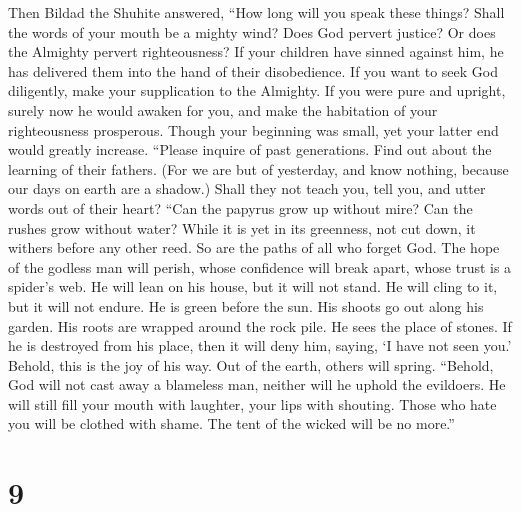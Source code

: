  Then Bildad the Shuhite answered,  ``How long
will you speak these things? Shall the words of your mouth be a mighty
wind?  Does God pervert justice? Or does the Almighty
pervert righteousness?  If your children have sinned against
him, he has delivered them into the hand of their disobedience.
 If you want to seek God diligently, make your supplication
to the Almighty.  If you were pure and upright, surely now
he would awaken for you, and make the habitation of your righteousness
prosperous.  Though your beginning was small, yet your
latter end would greatly increase.  ``Please inquire of past
generations. Find out about the learning of their fathers. 
(For we are but of yesterday, and know nothing, because our days on
earth are a shadow.)  Shall they not teach you, tell you,
and utter words out of their heart?  ``Can the papyrus grow
up without mire? Can the rushes grow without water?  While
it is yet in its greenness, not cut down, it withers before any other
reed.  So are the paths of all who forget God. The hope of
the godless man will perish,  whose confidence will break
apart, whose trust is a spider's web.  He will lean on his
house, but it will not stand. He will cling to it, but it will not
endure.  He is green before the sun. His shoots go out
along his garden.  His roots are wrapped around the rock
pile. He sees the place of stones.  If he is destroyed from
his place, then it will deny him, saying, `I have not seen you.'
 Behold, this is the joy of his way. Out of the earth,
others will spring.  ``Behold, God will not cast away a
blameless man, neither will he uphold the evildoers.  He
will still fill your mouth with laughter, your lips with shouting.
 Those who hate you will be clothed with shame. The tent of
the wicked will be no more.''

\hypertarget{section-7}{%
\section{9}\label{section-7}}

